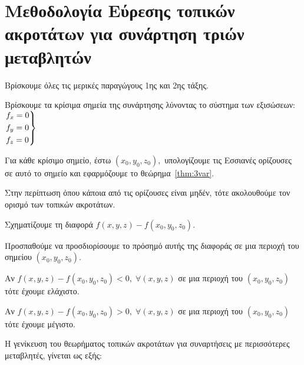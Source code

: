 \section{Μεθοδολογία Εύρεσης τοπικών ακροτάτων για συνάρτηση τριών μεταβλητών}

\begin{enumerate}
    \item Βρίσκουμε όλες τις μερικές παραγώγους 1ης και 2ης τάξης.
    \item Βρίσκουμε τα κρίσιμα σημεία της συνάρτησης λύνοντας το σύστημα των εξισώσεων: 
        $ \begin{rcases}
            f_{x} = 0 \\
            f_{y} = 0 \\
            f_{z} = 0
        \end{rcases} $
    \item Για κάθε κρίσιμο σημείο, έστω $ (x_{0}, y_{0}, z_{0}), $ υπολογίζουμε 
        τις Εσσιανές ορίζουσες σε αυτό το σημείο και εφαρμόζουμε το 
        θεώρημα~\ref{thm:3var}.
    \item Στην περίπτωση όπου κάποια από τις ορίζουσες είναι μηδέν, τότε 
        ακολουθούμε τον ορισμό των τοπικών ακροτάτων.
        \begin{myitemize}
            \item Σχηματίζουμε τη διαφορά $ f(x,y,z) - f(x_{0}, y_{0}, z_{0}) $.
            \item Προσπαθούμε να προσδιορίσουμε το πρόσημό αυτής της διαφοράς σε 
                μια περιοχή του σημείου $ (x_{0}, y_{0}, z_{0}) $.
                \begin{myitemize}
                    \item Αν $ f(x,y,z) - f(x_{0}, y_{0}, z_{0}) < 0, \; 
                        \forall (x,y,z) $ σε μια
                        περιοχή του $ (x_{0}, y_{0}, z_{0}) $ τότε έχουμε ελάχιστο. 
                    \item Αν $ f(x,y,z) - f(x_{0}, y_{0}, z_{0}) > 0, \; 
                        \forall (x,y,z) $ σε μια
                        περιοχή του $ (x_{0}, y_{0}, z_{0}) $ τότε έχουμε μέγιστο. 
                \end{myitemize}
        \end{myitemize}
\end{enumerate}

Η γενίκευση του θεωρήματος τοπικών ακροτάτων για συναρτήσεις με περισσότερες 
μεταβλητές, γίνεται ως εξής: 

